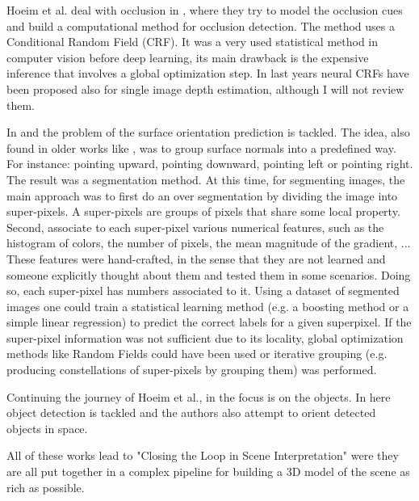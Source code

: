 Hoeim et al. deal with occlusion in \cite{autopopup4}, where they try to model the occlusion cues and build a computational method for occlusion detection.
The method uses a Conditional Random Field (CRF).
It was a very used statistical method in computer vision before deep learning, its main drawback is the expensive inference that involves a global optimization step.
In last years neural CRFs have been proposed also for single image depth estimation, although I will not review them.

In \cite{autopopup2} and \cite{autopopup5} the problem of the surface orientation prediction is tackled.
The idea, also found in older works like \cite{VideoCompass}, was to group surface normals into a predefined way.
For instance: pointing upward, pointing downward, pointing left or pointing right.
The result was a segmentation method.
At this time, for segmenting images, the main approach was to first do an over segmentation by dividing the image into super-pixels.
A super-pixels are groups of pixels that share some local property.
Second, associate to each super-pixel various numerical features, such as the histogram of colors, the number of pixels, the mean magnitude of the gradient, ...
These features were hand-crafted, in the sense that they are not learned and someone explicitly thought about them and tested them in some scenarios.
Doing so, each super-pixel has numbers associated to it.
Using a dataset of segmented images one could train a statistical learning method (e.g. a boosting method or a simple linear regression) to predict the correct labels for a given superpixel.
If the super-pixel information was not sufficient due to its locality, global optimization methods like Random Fields could have been used or iterative grouping (e.g. producing constellations of super-pixels by grouping them) was performed.

Continuing the journey of Hoeim et al., in \cite{autopopup3} the focus is on the objects.
In here object detection is tackled and the authors also attempt to orient detected objects in space.

All of these works lead to "Closing the Loop in Scene Interpretation" \cite{autopopup6} were they are all put together in a complex pipeline for building a 3D model of the scene as rich as possible.